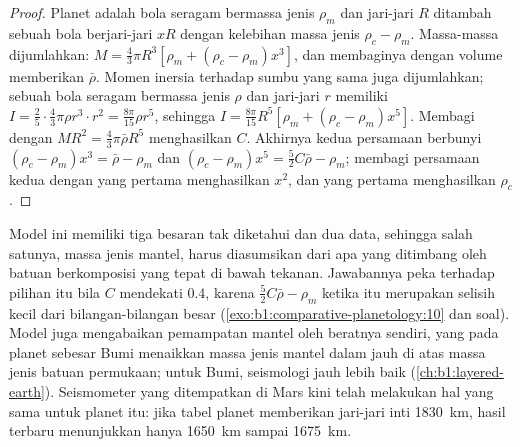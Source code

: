 \begin{proof}
Planet adalah bola seragam bermassa jenis $\rho_m$ dan jari-jari $R$ ditambah sebuah bola berjari-jari $xR$ dengan kelebihan massa jenis $\rho_c - \rho_m$. Massa-massa dijumlahkan: $M = \tfrac43\pi R^3[\rho_m + (\rho_c - \rho_m)x^3]$, dan membaginya dengan volume memberikan $\bar\rho$. Momen inersia terhadap sumbu yang sama juga dijumlahkan; sebuah bola seragam bermassa jenis $\rho$ dan jari-jari $r$ memiliki
$I = \tfrac25\cdot\tfrac43\pi\rho r^3\cdot r^2 = \tfrac{8\pi}{15}\rho r^5$,
sehingga $I = \tfrac{8\pi}{15}R^5[\rho_m + (\rho_c - \rho_m)x^5]$. Membagi dengan
$MR^2 = \tfrac43\pi\bar\rho R^5$ menghasilkan $C$. Akhirnya kedua persamaan berbunyi
$(\rho_c - \rho_m)x^3 = \bar\rho - \rho_m$ dan $(\rho_c - \rho_m)x^5 =
\tfrac52C\bar\rho - \rho_m$; membagi persamaan kedua dengan yang pertama menghasilkan $x^2$,
dan yang pertama menghasilkan $\rho_c$.
\end{proof}

Model ini memiliki tiga besaran tak diketahui dan dua data, sehingga salah satunya, massa jenis mantel, harus diasumsikan dari apa yang ditimbang oleh batuan berkomposisi yang tepat di bawah tekanan. Jawabannya peka terhadap pilihan itu bila $C$ mendekati $0.4$, karena $\tfrac52C\bar\rho - \rho_m$ ketika itu merupakan selisih kecil dari bilangan-bilangan besar (\cref{exo:b1:comparative-planetology:10} dan soal). Model juga mengabaikan pemampatan mantel oleh beratnya sendiri, yang pada planet sebesar Bumi menaikkan massa jenis mantel dalam jauh di atas massa jenis batuan permukaan; untuk Bumi, seismologi jauh lebih baik (\cref{ch:b1:layered-earth}). Seismometer yang ditempatkan di Mars kini telah melakukan hal yang sama untuk planet itu: jika tabel planet memberikan jari-jari inti \qty{1830}{km}, hasil terbaru menunjukkan hanya \qty{1650}{km} sampai \qty{1675}{km}.

